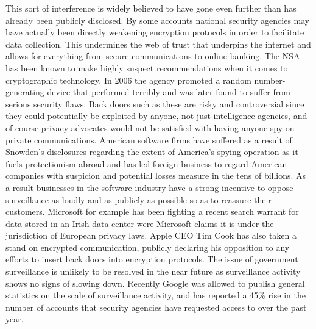 This sort of interference is widely believed to have gone even further than has already been publicly disclosed.
By some accounts national security agencies may have actually been directly weakening encryption protocols in order to facilitate data collection.\autocite[]{CrackedCredibility}
This undermines the web of trust that underpins the internet and allows for everything from secure communications to online banking.\autocite[]{CrackedCredibility}
The NSA has been known to make highly suspect recommendations when it comes to cryptographic technology. In 2006 the agency promoted a random number-generating device that performed terribly and was later found to suffer from serious security flaws.\autocite[]{CrackedCredibility}
Back doors such as these are risky and controversial since they could potentially be exploited by anyone, not just intelligence agencies, and of course privacy advocates would not be satisfied with having anyone spy on private communications.\autocite[]{CrackedCredibility}
American software firms have suffered as a result of Snowden's disclosures regarding the extent of America's spying operation as it fuels protectionism abroad and has led foreign business to regard American companies with suspicion and potential losses measure in the tens of billions.\autocite[]{CrackedCredibility}
As a result businesses in the software industry have a strong incentive to oppose surveillance as loudly and as publicly as possible so as to reassure their customers.
Microsoft for example has been fighting a recent search warrant for data stored in an Irish data center were Microsoft claims it is under the jurisdiction of European privacy laws.\autocite{MicrosoftEmail}
Apple CEO Tim Cook has also taken a stand on encrypted communication, publicly declaring his opposition to any efforts to insert back doors into encryption protocols.\autocite[]{StrongEncryptionCook}
The issue of government surveillance is unlikely to be resolved in the near future as surveillance activity shows no signs of slowing down.
Recently Google was allowed to publish general statistics on the scale of surveillance activity, and has reported a 45\% rise in the number of accounts that security agencies have requested access to over the past year.\autocite[]{DataRequests}
